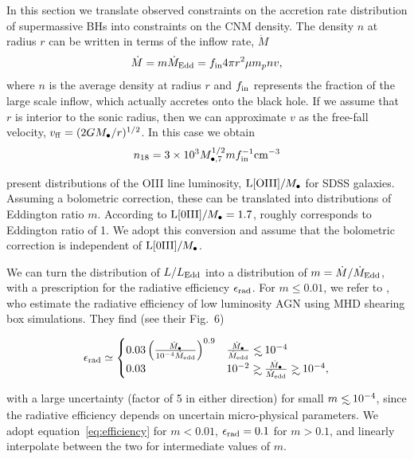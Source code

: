 \documentclass[usenatbib,fleqn]{mnras}
\newcommand\lsim{\mathrel{\rlap{\lower4pt\hbox{\hskip1pt$\sim$}}
    \raise1pt\hbox{$<$}}}
\newcommand\gsim{\mathrel{\rlap{\lower4pt\hbox{\hskip1pt$\sim$}}
    \raise1pt\hbox{$>$}}}
\newcommand{\Mbh}[1][]{M_{\bullet#1}}
\begin{document}
In this section we translate observed constraints on the accretion
rate distribution of supermassive BHs into constraints on the CNM
density.  The density $n$ at radius $r$ can be written in terms of the
inflow rate, $\dot{M}$
\begin{equation}
\dot{M} = m \dot{M}_{\rm Edd}= f_{\rm in} 4 \pi r^2 \mu m_p n v,
\label{eq:mdot}
\end{equation}
where $n$ is the average density at radius $r$ and $f_{\rm in}$
represents the fraction of the large scale inflow, which actually
accretes onto the black hole.  If we assume that $r$ is interior to
the sonic radius, then we can approximate $v$ as the free-fall
velocity, $v_{\rm ff} = (2 G \Mbh/r)^{1/2}$.  In this case we
obtain
\begin{equation}
n_{18} = 3 \times 10^3 M_{\bullet,7}^{1/2} m f_{\rm in}^{-1} {\rm
  cm}^{-3}
\label{eq:n18Edd}
\end{equation}

\citet{Kauffmann&Heckman2009} present distributions of the OIII line
luminosity, ${\rm L[OIII]}/\Mbh$ for SDSS galaxies.  Assuming a bolometric
correction, these can be translated into distributions of Eddington
ratio $m$.  According to \citet{Kauffmann&Heckman2009} ${\rm
  L[0III]}/\Mbh=1.7$, roughly corresponds to Eddington ratio of 1. We
adopt this conversion and assume that the bolometric correction is
independent of ${\rm L[0III]}/\Mbh$. 

We can turn the distribution of $L/L_{\rm Edd}$ into a distribution of
$m=\dot{M}/\dot{M}_{\rm Edd}$, with a prescription for the radiative
efficiency $\epsilon_{\rm rad}$.  For $m \leq 0.01$, we refer to
\citet{Sharma+2007}, who estimate the radiative efficiency of low
luminosity AGN using MHD shearing box simulations.  They find (see
their Fig.~6)

\begin{align}
\epsilon_{\rm rad} \simeq 
\begin{cases}
  0.03 \left(\frac{\dot{M}_{\bullet}}{10^{-4}\dot{M}_{\rm edd}}\right)^{0.9} & \frac{\dot{M}_{\bullet}}{\dot{M}_{\rm edd}} \lsim 10^{-4} \\
 0.03 &  10^{-2} \gsim \frac{\dot{M}_{\bullet}}{\dot{M}_{\rm edd}} \gsim  10^{-4},
\end{cases}
\label{eq:efficiency}
\end{align}


with a large uncertainty (factor of 5 in either direction) for small
$m\lsim 10^{-4}$, since the radiative efficiency depends on uncertain
micro-physical parameters. We adopt equation~\eqref{eq:efficiency} for
$m <0.01$, $\epsilon_{\rm rad}=0.1$ for $m>0.1$, and linearly
interpolate between the two for intermediate values of $m$.
\end{document}
